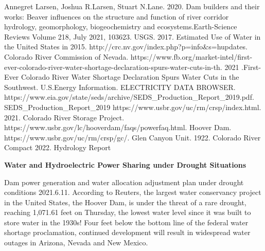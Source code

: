 \documentclass{mcmthesis}
\begin{document}
\begin{thebibliography}{10}  
	Annegret Larsen, Joshua R.Larsen, Stuart N.Lane. 2020. Dam builders and their works: Beaver influences on the structure and function of river corridor hydrology, geomorphology, biogeochemistry and ecosystems.Earth-Science Reviews
	Volume 218, July 2021, 103623.
	USGS. 2017. Estimated Use of Water in the United States in 2015.
	http://crc.nv.gov/index.php?p=info\&s=hupdates. Colorado River Commission of Nevada.
	https://www.fb.org/market-intel/first-ever-colorado-river-water-shortage-declaration-spurs-water-cuts-in-th. 2021 .First-Ever Colorado River Water Shortage Declaration Spurs Water Cuts in the Southwest.
	U.S.Energy Information. ELECTRICITY DATA BROWSER.
	https://www.eia.gov/state/seds/archive/SEDS\_Production\_Report\_2019.pdf. SEDS\_Production\_Report\_2019
	https://www.usbr.gov/uc/rm/crsp/index.html. 2021. Colorado River Storage Project.
	https://www.usbr.gov/lc/hooverdam/faqs/powerfaq.html. Hoover Dam.
	https://www.usbr.gov/uc/rm/crsp/gc/. Glen Canyon Unit.
	1922. Colorado River Compact
	2022. Hydrology Report
	
\end{thebibliography}

\newpage
\begin{center}
	\LARGE
	\textbf{Water and Hydroelectric Power Sharing under Drought Situations}
\end{center}

Dam power generation and water allocation adjustment plan under drought conditions
2021.6.11. According to Reuters, the largest water conservancy project in the United States, the Hoover Dam, is under the threat of a rare drought, reaching 1,071.61 feet on Thursday, the lowest water level since it was built to store water in the 1930s! Four feet below the bottom line of the federal water shortage proclamation, continued development will result in widespread water outages in Arizona, Nevada and New Mexico.
\begin{figure}[h]
	\centering
\end{figure}
\end{document}

